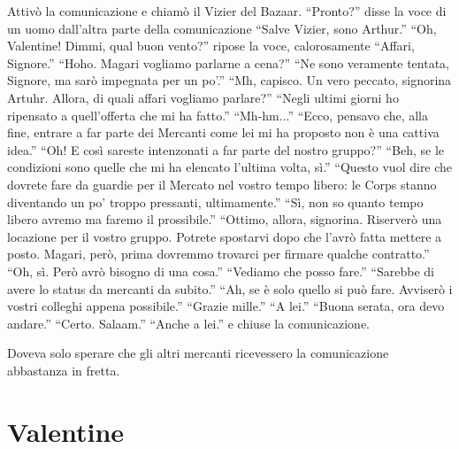     Attivò la comunicazione e chiamò il Vizier del Bazaar. ``Pronto?'' disse la voce di un uomo dall'altra parte della
    comunicazione ``Salve Vizier, sono Arthur.'' ``Oh, Valentine! Dimmi, qual buon vento?'' ripose la voce,
    calorosamente ``Affari, Signore.'' ``Hoho. Magari vogliamo parlarne a cena?'' ``Ne sono veramente tentata, Signore,
    ma sarò impegnata per un po'.'' ``Mh, capisco. Un vero peccato, signorina Artuhr. Allora, di quali affari vogliamo
    parlare?'' ``Negli ultimi giorni ho ripensato a quell'offerta che mi ha fatto.'' ``Mh-hm...'' ``Ecco, pensavo che,
    alla fine, entrare a far parte dei Mercanti come lei mi ha proposto non è una cattiva idea.'' ``Oh! E così sareste
    intenzonati a far parte del nostro gruppo?'' ``Beh, se le condizioni sono quelle che mi ha elencato l'ultima volta,
    sì.'' ``Questo vuol dire che dovrete fare da guardie per il Mercato nel vostro tempo libero: le Corps stanno
    diventando un po' troppo pressanti, ultimamente.'' ``Sì, non so quanto tempo libero avremo ma faremo il
    prossibile.'' ``Ottimo, allora, signorina. Riserverò una locazione per il vostro gruppo. Potrete spostarvi dopo che
    l'avrò fatta mettere a posto. Magari, però, prima dovremmo trovarci per firmare qualche contratto.'' ``Oh, sì. Però
    avrò bisogno di una cosa.'' ``Vediamo che posso fare.'' ``Sarebbe di avere lo status da mercanti da subito.'' ``Ah,
    se è solo quello si può fare. Avviserò i vostri colleghi appena possibile.'' ``Grazie mille.'' ``A lei.'' ``Buona
    serata, ora devo andare.'' ``Certo. Salaam.'' ``Anche a lei.'' e chiuse la comunicazione.

    Doveva solo sperare che gli altri mercanti ricevessero la comunicazione abbastanza in fretta.

  \section*{Valentine}

